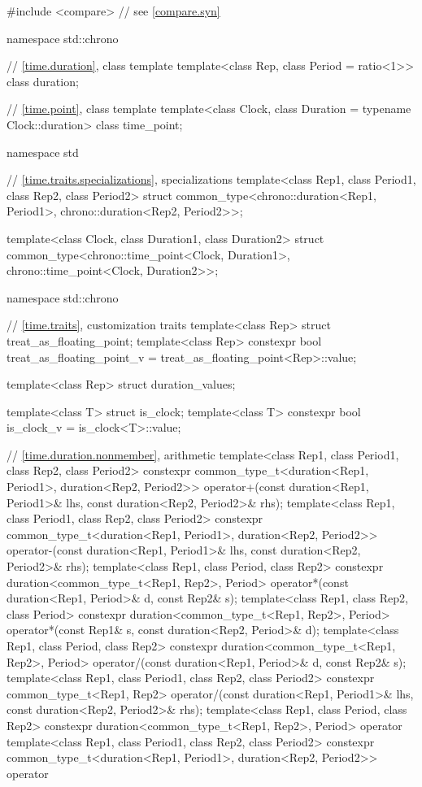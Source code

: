 \begin{codeblock}
#include <compare>              // see \ref{compare.syn}

namespace std::chrono {
  // \ref{time.duration}, class template 
  template<class Rep, class Period = ratio<1>> class duration;

  // \ref{time.point}, class template 
  template<class Clock, class Duration = typename Clock::duration> class time_point;
}

namespace std {
  // \ref{time.traits.specializations},  specializations
  template<class Rep1, class Period1, class Rep2, class Period2>
    struct common_type<chrono::duration<Rep1, Period1>,
                       chrono::duration<Rep2, Period2>>;

  template<class Clock, class Duration1, class Duration2>
    struct common_type<chrono::time_point<Clock, Duration1>,
                       chrono::time_point<Clock, Duration2>>;
}

namespace std::chrono {
  // \ref{time.traits}, customization traits
  template<class Rep> struct treat_as_floating_point;
  template<class Rep>
    constexpr bool treat_as_floating_point_v = treat_as_floating_point<Rep>::value;

  template<class Rep> struct duration_values;

  template<class T> struct is_clock;
  template<class T> constexpr bool is_clock_v = is_clock<T>::value;

  // \ref{time.duration.nonmember},  arithmetic
  template<class Rep1, class Period1, class Rep2, class Period2>
    constexpr common_type_t<duration<Rep1, Period1>, duration<Rep2, Period2>>
      operator+(const duration<Rep1, Period1>& lhs, const duration<Rep2, Period2>& rhs);
  template<class Rep1, class Period1, class Rep2, class Period2>
    constexpr common_type_t<duration<Rep1, Period1>, duration<Rep2, Period2>>
      operator-(const duration<Rep1, Period1>& lhs, const duration<Rep2, Period2>& rhs);
  template<class Rep1, class Period, class Rep2>
    constexpr duration<common_type_t<Rep1, Rep2>, Period>
      operator*(const duration<Rep1, Period>& d, const Rep2& s);
  template<class Rep1, class Rep2, class Period>
    constexpr duration<common_type_t<Rep1, Rep2>, Period>
      operator*(const Rep1& s, const duration<Rep2, Period>& d);
  template<class Rep1, class Period, class Rep2>
    constexpr duration<common_type_t<Rep1, Rep2>, Period>
      operator/(const duration<Rep1, Period>& d, const Rep2& s);
  template<class Rep1, class Period1, class Rep2, class Period2>
    constexpr common_type_t<Rep1, Rep2>
      operator/(const duration<Rep1, Period1>& lhs, const duration<Rep2, Period2>& rhs);
  template<class Rep1, class Period, class Rep2>
    constexpr duration<common_type_t<Rep1, Rep2>, Period>
      operator%
  template<class Rep1, class Period1, class Rep2, class Period2>
    constexpr common_type_t<duration<Rep1, Period1>, duration<Rep2, Period2>>
      operator%

}
\end{codeblock}
